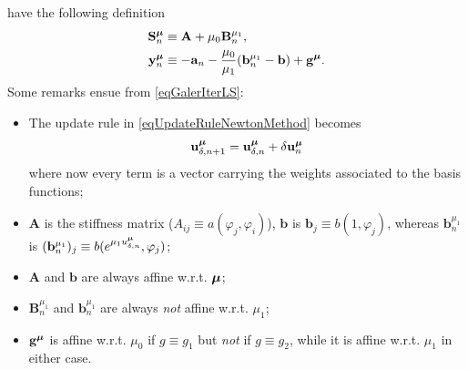 \documentclass[
    conference,
    nofonttune,
    11pt
]{IEEEtran}
\begin{document}
            have the following definition
            \begin{equation*}
                \begin{aligned}
                    \mathbf S^{\boldsymbol\mu}_n&\equiv
                    \mathbf A+\mu_0\mathbf B^{\mu_1}_n,\\
                    \mathbf y^{\boldsymbol\mu}_n&\equiv-\mathbf a_n
                    -\frac{\mu_0}{\mu_1}(\mathbf b^{\mu_1}_n-\mathbf b)
                    +\mathbf g^{\boldsymbol\mu}.
                \end{aligned}
            \end{equation*}
            Some remarks ensue from \eqref{eqGalerIterLS}:

            \begin{itemize}[
                itemsep=2pt,
            ]
                \item The update rule in \eqref{eqUpdateRuleNewtonMethod} becomes
                    \begin{equation}
                        \label{eqGalerUpdateRuleNewtonMethod}
                        \mathbf u_{\delta,n+1}^\boldmu
                        =\mathbf u_{\delta,n}^\boldmu
                        +\delta\mathbf u_n^\boldmu
                    \end{equation}
                    where now every term is a vector carrying the weights associated to the basis functions;

                \item $\mathbf A$ is the stiffness matrix ($A_{ij}\equiv a(\varphi_j,\varphi_i)$), $\mathbf b$ is $\mathbf b_j\equiv b(1,\varphi_j)$, whereas $\mathbf b^{\mu_1}_n$ is $(\mathbf b^{\mu_1}_n)_j\equiv b(e^{\mu_1u^{\boldsymbol\mu}_{\delta,n}},\varphi_j)$;
                
                \item $\mathbf A$ and $\mathbf b$ are always affine w.r.t. ${\boldsymbol\mu}$;
                
                \item $\mathbf B_n^{\mu_1}$ and $\mathbf b_n^{\mu_1}$ are always \textit{not} affine w.r.t. $\mu_1$;
                
                \item $\mathbf g^{\boldsymbol\mu}$ is affine w.r.t. $\mu_0$ if $g\equiv g_1$ but \textit{not} if $g\equiv g_2$, while it is affine w.r.t. $\mu_1$ in either case.
            \end{itemize}
\end{document}

